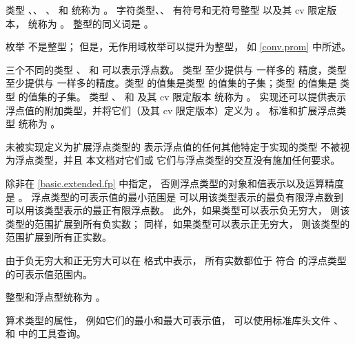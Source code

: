 \pnum
{}%
类型 、、
、 和 
统称为 。
字符类型、、
有符号和无符号整型
以及其 cv 限定版本，
统称为 。
整型的同义词是 。
\begin{note}
枚举 不是整型；
但是，无作用域枚举可以提升为整型，
如 \ref{conv.prom} 中所述。
\end{note}

\pnum
{}%
三个不同的类型
%
、
%
 和
%
可以表示浮点数。
类型  至少提供与  一样多的
精度，类型  至少提供与  一样多的精度。类型
 的值集是类型
 的值集的子集；类型  的值集是
类型  的值集的子集。
类型
、 和 
及其 cv 限定版本
统称为 。
实现还可以提供表示
浮点值的附加类型，并将它们（及其 cv 限定版本）定义为
。
标准和扩展浮点类型
统称为 。
\begin{note}
未被实现定义为扩展浮点类型的
表示浮点值的任何其他特定于实现的类型
不被视为浮点类型，并且
本文档对它们或
它们与浮点类型的交互没有施加任何要求。
\end{note}
除非在 \ref{basic.extended.fp} 中指定，
否则浮点类型的对象和值表示以及运算精度是 。
\pnum
浮点类型的可表示值的最小范围是
可以用该类型表示的最负有限浮点数到
可以用该类型表示的最正有限浮点数。
此外，如果类型可以表示负无穷大，
则该类型的范围扩展到所有负实数；
同样，如果类型可以表示正无穷大，
则该类型的范围扩展到所有正实数。
\begin{note}
由于负无穷大和正无穷大可以在
\IsoFloatUndated{} 格式中表示，
所有实数都位于
符合 \IsoFloatUndated{} 的浮点类型的可表示值范围内。
\end{note}

\pnum
整型和浮点型统称为 。
\begin{note}
算术类型的属性，
例如它们的最小和最大可表示值，
可以使用标准库头文件
、
 和
 中的工具查询。
\end{note}

